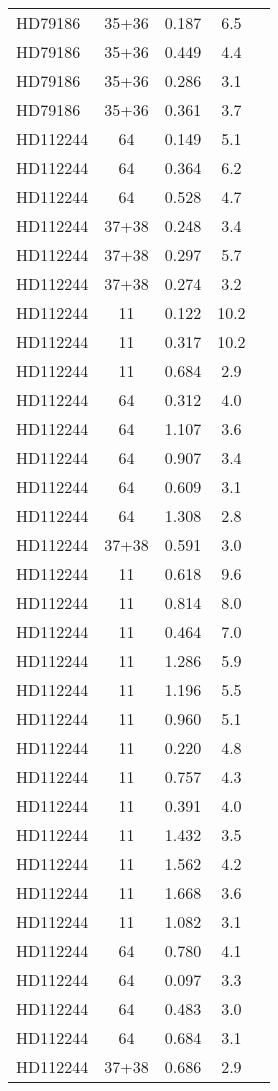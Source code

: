 \begin{table*}
\begin{tabular}{l c c c c}
HD79186 & 35+36 & 0.187 & 6.5\\ 
HD79186 & 35+36 & 0.449 & 4.4\\ 
HD79186 & 35+36 & 0.286 & 3.1\\ 
HD79186 & 35+36 & 0.361 & 3.7\\ 
\hline
HD112244 & 64 & 0.149 & 5.1\\ 
HD112244 & 64 & 0.364 & 6.2\\ 
HD112244 & 64 & 0.528 & 4.7\\ 
HD112244 & 37+38 & 0.248 & 3.4\\ 
HD112244 & 37+38 & 0.297 & 5.7\\ 
HD112244 & 37+38 & 0.274 & 3.2\\ 
HD112244 & 11 & 0.122 & 10.2\\ 
HD112244 & 11 & 0.317 & 10.2\\ 
HD112244 & 11 & 0.684 & 2.9\\ 
HD112244 & 64 & 0.312 & 4.0\\ 
HD112244 & 64 & 1.107 & 3.6\\ 
HD112244 & 64 & 0.907 & 3.4\\ 
HD112244 & 64 & 0.609 & 3.1\\ 
HD112244 & 64 & 1.308 & 2.8\\ 
HD112244 & 37+38 & 0.591 & 3.0\\ 
HD112244 & 11 & 0.618 & 9.6\\ 
HD112244 & 11 & 0.814 & 8.0\\ 
HD112244 & 11 & 0.464 & 7.0\\ 
HD112244 & 11 & 1.286 & 5.9\\ 
HD112244 & 11 & 1.196 & 5.5\\ 
HD112244 & 11 & 0.960 & 5.1\\ 
HD112244 & 11 & 0.220 & 4.8\\ 
HD112244 & 11 & 0.757 & 4.3\\ 
HD112244 & 11 & 0.391 & 4.0\\ 
HD112244 & 11 & 1.432 & 3.5\\ 
HD112244 & 11 & 1.562 & 4.2\\ 
HD112244 & 11 & 1.668 & 3.6\\ 
HD112244 & 11 & 1.082 & 3.1\\ 
HD112244 & 64 & 0.780 & 4.1\\ 
HD112244 & 64 & 0.097 & 3.3\\ 
HD112244 & 64 & 0.483 & 3.0\\ 
HD112244 & 64 & 0.684 & 3.1\\ 
HD112244 & 37+38 & 0.686 & 2.9\\ 

\end{tabular}
\end{table*}

